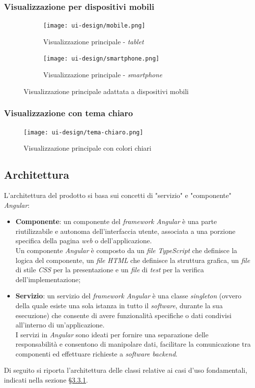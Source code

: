 \subsubsection*{Visualizzazione per dispositivi mobili}
\label{subsubsec:mobile}
  \begin{figure}[H]
	\centering
	\begin{subfigure}[t]{.5\textwidth}
	  \centering
	  \texttt{[image: ui-design/mobile.png]}
	  \caption{Visualizzazione principale - \textit{tablet}}
	\end{subfigure}%
	\begin{subfigure}[t]{.5\textwidth}
	  \centering
	  \texttt{[image: ui-design/smartphone.png]}
	  \caption{Visualizzazione principale - \textit{smartphone}}
	\end{subfigure}
	\caption{Visualizzazione principale adattata a dispositivi mobili}
\end{figure}

\subsubsection*{Visualizzazione con tema chiaro}

\begin{figure}[H]
    \centering
    \texttt{[image: ui-design/tema-chiaro.png]}
    \caption{Visualizzazione principale con colori chiari}
\end{figure}

\subsection{Architettura}
\label{subsec:architettura}

L'architettura del prodotto si basa sui concetti di "servizio" e "componente" \textit{Angular}:
\begin{itemize}
    \item \textbf{Componente}: un componente del \textit{framework Angular} è una parte riutilizzabile e autonoma dell'interfaccia utente, associata a una porzione specifica della pagina \textit{web} o dell'applicazione. \\
            Un componente \textit{Angular} è composto da un \textit{file TypeScript} che definisce la logica del componente, un \textit{file HTML} che definisce la struttura grafica, un \textit{file} di stile \textit{CSS} per la presentazione e un \textit{file} di \textit{test} per la verifica dell'implementazione;
    \item \textbf{Servizio}: un servizio del \textit{framework Angular} è una classe \textit{singleton} (ovvero della quale esiste una sola istanza in tutto il \textit{software}, durante la sua esecuzione) che consente di avere funzionalità specifiche o dati condivisi all'interno di un'applicazione. \\
            I servizi in \textit{Angular} sono ideati per fornire una separazione delle responsabilità e consentono di manipolare dati, facilitare la comunicazione tra componenti ed effettuare richieste a \textit{software backend}.
\end{itemize}
Di seguito si riporta l'architettura delle classi relative ai casi d'uso fondamentali, indicati nella sezione \hyperref[subsubsec:casi-d'uso]{§3.3.1}.

